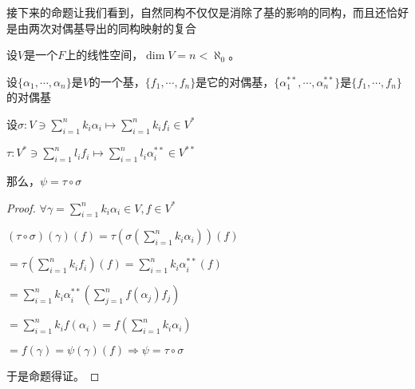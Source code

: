 \documentclass[12pt, a4paper, oneside, UTF8]{ctexbook}
\begin{document}
			接下来的命题让我们看到，自然同构不仅仅是消除了基的影响的同构，而且还恰好是由两次对偶基导出的同构映射的复合
			\begin{proposition}
				设$V$是一个$F$上的线性空间，$\dim V = n < \aleph_0$。

				设$\{\alpha_1,\cdots,\alpha_n\}$是$V$的一个基，$\{f_1,\cdots,f_n\}$是它的对偶基，$\{\alpha_1^{**},\cdots,\alpha_n^{**}\}$是$\{f_1,\cdots,f_n\}$的对偶基
				
				设$\sigma : V \ni \sum\limits_{i=1}^{n} k_i \alpha_i \mapsto \sum\limits_{i=1}^{n} k_i f_i \in V^*$

				$\tau : V^* \ni \sum\limits_{i=1}^{n} l_i f_i \mapsto \sum\limits_{i=1}^{n} l_i \alpha_i^{**} \in V^{**}$
			
				那么，$\psi = \tau \circ \sigma $
			\end{proposition}
			\begin{proof}
				$\forall \gamma  = \sum\limits_{i=1}^{n} k_i \alpha_i \in V,f\in V^*$

				$(\tau \circ \sigma) (\gamma )(f)=\tau \left(\sigma (\sum\limits_{i=1}^{n} k_i \alpha_i)\right)(f)$
			
				$=\tau (\sum\limits_{i=1}^{n} k_i f_i)(f) = \sum\limits_{i=1}^{n} k_i \alpha_i^{**}(f)$

				$=\sum\limits_{i=1}^{n} k_i \alpha_i^{**}\left(\sum\limits_{j=1}^{n} f(\alpha_j)f_j\right)$

				$=\sum\limits_{i=1}^{n} k_i f(\alpha_i)=f \left(\sum\limits_{i=1}^{n} k_i \alpha_i\right)$
				
				$=f(\gamma )=\psi (\gamma )(f) \Rightarrow \psi =\tau \circ \sigma $

				于是命题得证。
			\end{proof}
\ifx\allfiles\undefined
\end{document}
